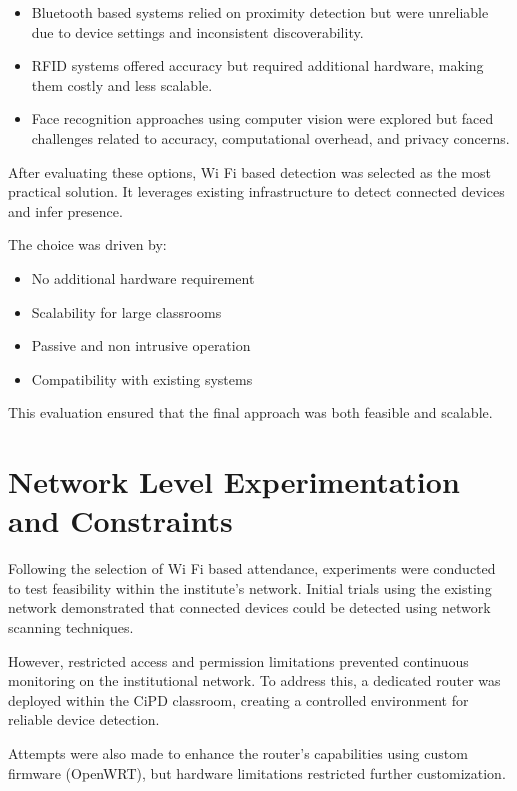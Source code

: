 \begin{itemize}
    \item Bluetooth based systems relied on proximity detection but were unreliable due to device
    settings and inconsistent discoverability.
    \item RFID systems offered accuracy but required additional hardware, making them costly and
    less scalable.
    \item Face recognition approaches using computer vision were explored but faced challenges
    related to accuracy, computational overhead, and privacy concerns.
\end{itemize}

After evaluating these options, Wi Fi based detection was selected as the most practical solution. It
leverages existing infrastructure to detect connected devices and infer presence.

The choice was driven by:

\begin{itemize}
    \item No additional hardware requirement
    \item Scalability for large classrooms
    \item Passive and non intrusive operation
    \item Compatibility with existing systems
\end{itemize}

This evaluation ensured that the final approach was both feasible and scalable.



\section{Network Level Experimentation and Constraints}

Following the selection of Wi Fi based attendance, experiments were conducted to test feasibility
within the institute's network. Initial trials using the existing network demonstrated that connected
devices could be detected using network scanning techniques.

However, restricted access and permission limitations prevented continuous monitoring on the
institutional network. To address this, a dedicated router was deployed within the CiPD classroom,
creating a controlled environment for reliable device detection.

Attempts were also made to enhance the router's capabilities using custom firmware (OpenWRT),
but hardware limitations restricted further customization.

